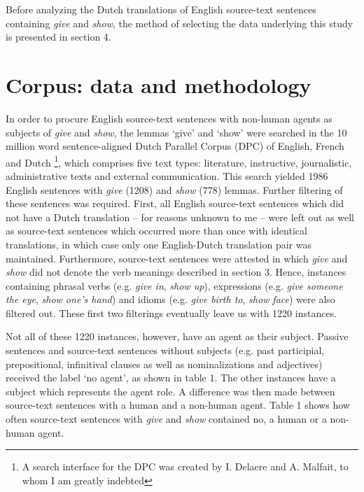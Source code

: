\documentclass[output=paper]{LSP/langsci}
\begin{document}
Before analyzing the Dutch translations of English source-text sentences containing \textit{give} and \textit{show}, the method of selecting the data underlying this study is presented in section 4.

\section{Corpus: data and methodology}

In order to procure English source-text sentences with non-human agents as subjects of \textit{give} and \textit{show}, the lemmas ‘give’ and ‘show’ were searched in the 10 million word sentence-aligned Dutch Parallel Corpus (DPC) of English, French and Dutch \citep[see e.g.][]{Rura2008}\footnote{A search interface for the DPC was created by I. Delaere and A. Malfait, to whom I am greatly indebted}, which comprises five text types: literature, instructive, journalistic, administrative texts and external communication. This search yielded 1986 English sentences with \textit{give} (1208) and \textit{show} (778) lemmas. Further filtering of these sentences was required. First, all English source-text sentences which did not have a Dutch translation – for reasons unknown to me – were left out as well as source-text sentences which occurred more than once with identical translations, in which case only one English-Dutch translation pair was maintained. Furthermore, source-text sentences were attested in which \textit{give} and \textit{show} did not denote the verb meanings described in section 3. Hence, instances containing phrasal verbs (e.g. \textit{give in}, \textit{show up}), expressions (e.g. \textit{give someone the eye}, \textit{show one’s hand}) and idioms (e.g. \textit{give birth to}, \textit{show face}) were also filtered out. These first two filterings eventually leave us with 1220 instances.

Not all of these 1220 instances, however, have an agent as their subject. Passive sentences and source-text sentences without subjects (e.g. past participial, prepositional, infinitival clauses as well as nominalizations and adjectives) received the label ‘no agent’, as shown in table 1. The other instances have a subject which represents the agent role. A difference was then made between source-text sentences with a human and a non-human agent. Table 1 shows how often source-text sentences with \textit{give} and \textit{show} contained no, a human or a non-human agent.     
\end{document}
